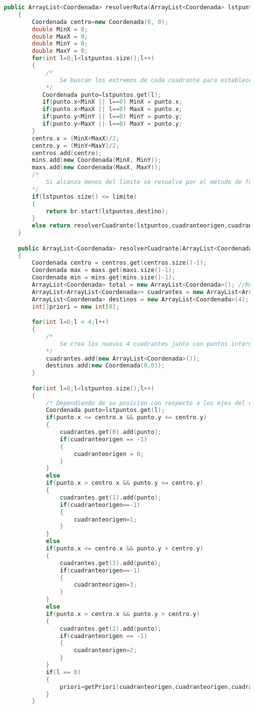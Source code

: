 \begin{lstlisting}[language=C++, caption=Algoritmo Base del Método de Cuadrantes, label=lst:codigo11,escapechar=|]
	public ArrayList<Coordenada> resolverRuta(ArrayList<Coordenada> lstpuntos,Coordenada destino,int cuadranteorigen, int cuadrantedestino)
	{
		Coordenada centro=new Coordenada(0, 0);
		double MinX = 0;
		double MaxX = 0;
		double MinY = 0;
		double MaxY = 0;     
		for(int l=0;l<lstpuntos.size();l++)
		{
            /* 
                Se buscan los extremos de cada cuadrante para establecer un punto centro, esto es en caso de que se necesite volver a fragmentar de nuevo el cuadrante 
            */
		   Coordenada punto=lstpuntos.get(l);
		   if(punto.x<MinX || l==0)	MinX = punto.x;
		   if(punto.x>MaxX || l==0)	MaxX = punto.x;
		   if(punto.y<MinY || l==0)	MinY = punto.y;
		   if(punto.y>MaxY || l==0)	MaxY = punto.y; 
		}
		centro.x = (MinX+MaxX)/2;
		centro.y = (MinY+MaxY)/2;
		centros.add(centro);
		mins.add(new Coordenada(MinX, MinY));
		maxs.add(new Coordenada(MaxX, MaxY));
		/* 
		    Si alcanza menos del limite se resuelve por el método de fuerza bruta, si no se fragmentara de manera infinita hasta satisfacer el limite 
		*/
		if(lstpuntos.size() <= limite)
		{
			return br.start(lstpuntos,destino);
		}
		else return resolverCuadrante(lstpuntos,cuadranteorigen,cuadrantedestino);
	}

	public ArrayList<Coordenada> resolverCuadrante(ArrayList<Coordenada> lstpuntos,int cuadranteorigen, int cuadrantedestino)
	{
		Coordenada centro = centros.get(centros.size()-1);
		Coordenada max = maxs.get(maxs.size()-1);
		Coordenada min = mins.get(mins.size()-1);
		ArrayList<Coordenada> total = new ArrayList<Coordenada>(); //Resultado final
		ArrayList<ArrayList<Coordenada>> cuadrantes = new ArrayList<ArrayList<Coordenada>>();
		ArrayList<Coordenada> destinos = new ArrayList<Coordenada>(4);
		int[]priori = new int[0];

		for(int l=0;l < 4;l++)
		{
            /* 
                Se crea los nuevos 4 cuadrantes junto con puntos intermedios para conectar cuadrante-cuadrante 
            */
			cuadrantes.add(new ArrayList<Coordenada>());
			destinos.add(new Coordenada(0,0));
		}

		for(int l=0;l<lstpuntos.size();l++)
		{
			/* Dependiendo de su posicion con respecto a los ejes del centro se iran a un determinado cuadrante */
			Coordenada punto=lstpuntos.get(l);
			if(punto.x <= centro.x && punto.y <= centro.y)
			{
				cuadrantes.get(0).add(punto);
				if(cuadranteorigen == -1)
				{
					cuadranteorigen = 0;
				}
			}
			else 
			if(punto.x > centro.x && punto.y <= centro.y)
			{
				cuadrantes.get(1).add(punto);
				if(cuadranteorigen==-1)
				{
					cuadranteorigen=1;
				}
			}
			else 
			if(punto.x <= centro.x && punto.y > centro.y)
			{
				cuadrantes.get(3).add(punto);
				if(cuadranteorigen==-1)
				{
					cuadranteorigen=3;
				}
			}
			else 
			if(punto.x > centro.x && punto.y > centro.y)
			{
				cuadrantes.get(2).add(punto);
				if(cuadranteorigen == -1)	
				{
					cuadranteorigen=2;
				}
			} 
			if(l == 0)
			{
				priori=getPriori(cuadranteorigen,cuadranteorigen,cuadrantedestino);
			}
		}             
		 

\end{lstlisting}
